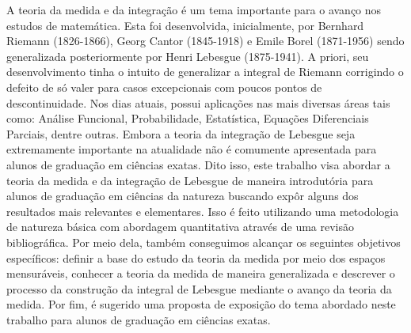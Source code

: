 A teoria da medida e da integração é um tema importante para o avanço nos estudos de matemática.
Esta foi desenvolvida, inicialmente, por Bernhard Riemann (1826-1866), Georg Cantor (1845-1918) e Emile Borel (1871-1956) sendo generalizada posteriormente por Henri Lebesgue
(1875-1941).
A priori, seu desenvolvimento tinha o intuito de generalizar a integral de Riemann corrigindo o defeito de só valer para casos excepcionais com poucos pontos de descontinuidade. Nos dias atuais,	 possui aplicações nas mais diversas áreas tais como: Análise Funcional, Probabilidade, Estatística, Equações Diferenciais Parciais, dentre outras. 
Embora a teoria da integração de Lebesgue seja extremamente importante na atualidade não é comumente apresentada para alunos de graduação em ciências exatas.
Dito isso, este trabalho visa abordar a teoria da medida e da integração de Lebesgue de maneira introdutória para alunos de graduação em ciências da natureza buscando expôr alguns dos resultados mais relevantes e elementares.
Isso é feito utilizando uma metodologia de natureza básica com abordagem quantitativa através de uma revisão bibliográfica.
Por meio dela, também conseguimos alcançar os seguintes objetivos específicos: definir a base do estudo da teoria da medida por meio dos espaços mensuráveis,
conhecer a teoria da medida de maneira generalizada e descrever o processo da construção da integral de Lebesgue mediante o avanço da teoria da medida.
Por fim, é sugerido uma proposta de exposição do tema abordado neste trabalho para alunos de graduação em ciências exatas.

